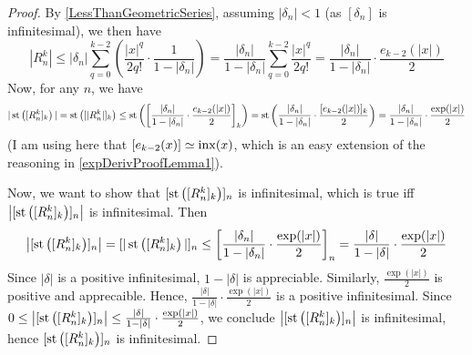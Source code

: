 \begin{proof}
    By \ref{LessThanGeometricSeries}, assuming $|\delta_n| < 1$ (as $[\delta_n]$ is infinitesimal), we then have
    \[ |R_n^k| \leq |\delta_n|  \sum_{q=0}^{k-2}\left(\frac{|x|^q}{2q!} \cdot \frac{1}{1-|\delta_n|}\right) = \frac{|\delta_n|}{1-|\delta_n|} \sum_{q=0}^{k-2} \frac{|x|^q}{2q!} = \frac{|\delta_n|}{1-|\delta_n|} \cdot \frac{e_{k-2}(|x|)}{2}\]
    Now, for any $n$, we have
    \[ |\operatorname{st}\left([R_n^k]_k\right)| = \operatorname{st}\left([|R_n^k|]_k\right) \leq \operatorname{st}\left(\left[\frac{|\delta_n|}{1-|\delta_n|} \cdot \frac{e_{k-2}(|x|)}{2}\right]_k\right) = \operatorname{st}\left(\frac{|\delta_n|}{1-|\delta_n|} \cdot \frac{[e_{k-2}(|x|)]_k}{2}\right) = \frac{|\delta_n|}{1-|\delta_n|} \cdot \frac{\exp(|x|)}{2} \]
    (I am using here that $[e_{k-2}(x)] \simeq \operatorname{inx}(x)$, which is an easy extension of the reasoning in \ref{expDerivProofLemma1}). 

    Now, we want to show that $[\operatorname{st}\left([R_n^k]_k\right)]_n$ is infinitesimal, which is true iff $\left|[\operatorname{st}\left([R_n^k]_k\right)]_n\right|$ is infinitesimal. Then
    \[\left|[\operatorname{st}\left([R_n^k]_k\right)]_n\right| = [|\operatorname{st}\left([R_n^k]_k\right)|]_n \leq \left[\frac{|\delta_n|}{1-|\delta_n|} \cdot \frac{\exp(|x|)}{2}\right]_n = \frac{|\delta|}{1-|\delta|} \cdot \frac{\exp(|x|)}{2}\] 
    Since $|\delta|$ is a positive infinitesimal, $1 - |\delta|$ is appreciable. Similarly, $\frac{\exp(|x|)}{2}$ is positive and apprecaible. Hence, $\frac{|\delta|}{1-|\delta|} \cdot \frac{\exp(|x|)}{2}$ is a positive infinitesimal. Since $0 \leq \left|[\operatorname{st}\left([R_n^k]_k\right)]_n\right| \leq \frac{|\delta|}{1-|\delta|} \cdot \frac{\exp(|x|)}{2}$, we conclude $\left|[\operatorname{st}\left([R_n^k]_k\right)]_n\right|$ is infinitesimal, hence $[\operatorname{st}\left([R_n^k]_k\right)]_n$ is infinitesimal.
\end{proof}